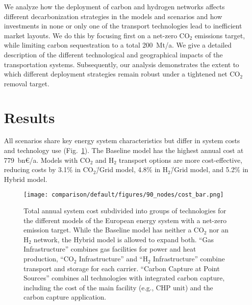 \documentclass[twocolumn]{article}
\newcommand{\COtwo}{CO$_2$}
\newcommand{\Htwo}{H$_2$}
\newcommand{\modBase}{Baseline model}
\newcommand{\modCO}{CO$_2$\=/Grid model}
\newcommand{\modH}{H$_2$\=/Grid model}
\newcommand{\modHybrid}{Hybrid model}
\newcommand{\carbon}{CO$_2$}
\newcommand{\hydrogen}{H$_2$}
\newcommand{\baselinemodel}{Baseline model}
\newcommand{\hybridmodel}{Hybrid model}
\begin{document}
We analyze how the deployment of carbon and hydrogen networks affects different decarbonization strategies in the models and scenarios and how investments in none or only one of the transport technologies lead to inefficient market layouts. We do this by focusing first on a net-zero \carbon{} emissions target, while limiting carbon sequestration to a total 200~Mt/a. We give a detailed description of the different technological and geographical impacts of the transportation systems. Subsequently, our analysis demonstrates the extent to which different deployment strategies remain robust under a tightened net \carbon{} removal target.


\section{Results}
\label{sec:results}


All scenarios share key energy system characteristics but differ in system costs and technology use (Fig.~\ref{fig:cost_bar}). The \modBase{} has the highest annual cost at 779~bn€/a. Models with \carbon{} and \hydrogen{} transport options are more cost-effective, reducing costs by 3.1\% in \modCO{}, 4.8\% in \modH{}, and 5.2\% in \modHybrid{}.

\begin{figure}[ht!]
    \centering
    \texttt{[image: comparison/default/figures/90\_nodes/cost\_bar.png]}
    \caption[short]{Total annual system cost subdivided into groups of technologies for the different models of the European energy system with a net-zero emission target. While the \modBase{} has neither a \COtwo{} nor an \Htwo{} network, the \modHybrid{} is allowed to expand both. ``Gas Infrastructure'' combines gas facilities for power and heat production, ``\COtwo{} Infrastructure'' and ``\Htwo{} Infrastructure'' combine transport and storage for each carrier. ``Carbon Capture at Point Sources'' combines all technologies with integrated carbon capture, including the cost of the main facility (e.g., CHP unit) and the carbon capture application.}
    \label{fig:cost_bar}
\end{figure}

\end{document}
